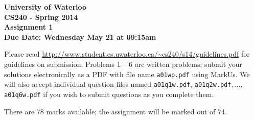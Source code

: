 \documentclass[12pt]{article}
\begin{document}
\begin{center}
{\Large\bf University of Waterloo}\\
\vspace{3mm}
{\Large\bf CS240 - Spring 2014}\\
\vspace{2mm}
{\Large\bf Assignment 1}\\
\vspace{3mm}
\textbf{Due Date: Wednesday May 21 at 09:15am}
\end{center}

\def\question#1{\item[\bf #1.]}
\def\part#1{\item[\bf #1)]}
\newcommand{\pc}[1]{\mbox{\textbf{#1}}} %

Please read
\url{http://www.student.cs.uwaterloo.ca/~cs240/s14/guidelines.pdf}
for guidelines on submission.  
Problems 1 -- 6 are written
problems; submit your solutions electronically as a PDF with file name {\tt a01wp.pdf} using MarkUs. We will also accept individual question files named {\tt a01q1w.pdf}, {\tt a01q2w.pdf}$, \dots,$ {\tt a01q6w.pdf} if you wish to submit questions as you complete them.

There are 78 marks available; the assignment will be marked out of 74.

\end{document}
